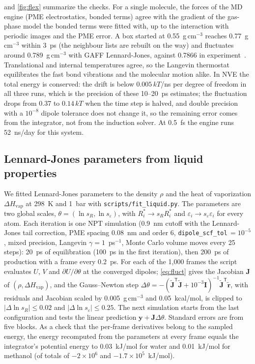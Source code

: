 \documentclass[11pt]{article}
\newcommand{\code}[1]{\texttt{#1}}
\newcommand{\Hvap}{\Delta H_\mathrm{vap}}
\begin{document}
 and \cref{fig:flex} summarize the checks. For a single molecule, the forces of the
MD engine (PME electrostatics, bonded terms) agree with the gradient of the gas-phase model the
bonded terms were fitted with, up to the interaction with periodic images and the PME error. A box
started at 0.55~g\,cm$^{-3}$ reaches 0.77~g\,cm$^{-3}$ within 3~ps (the neighbour lists are rebuilt on
the way) and fluctuates around 0.789~g\,cm$^{-3}$ with GAFF Lennard-Jones, against 0.7866 in
experiment~\cite{srivastava1987methanol}. Translational and internal temperatures agree, so the
Langevin thermostat equilibrates the fast bond vibrations and the molecular motion alike. In NVE
the total energy is conserved: the drift is below $0.005\,kT$/ns per degree of freedom in all three runs, which is the precision of these 10--20~ps estimates; the fluctuation drops from 0.37 to $0.14\,kT$ when the time step is halved, and double precision with a $10^{-8}$ dipole tolerance does not change it, so the remaining error comes from the integrator, not from the induction solver. At 0.5~fs the engine runs 52~ns/day for this
system.

\subsection{Lennard-Jones parameters from liquid properties}\label{sec:liquid}
We fitted Lennard-Jones parameters to the density $\rho$ and the heat of vaporization $\Hvap$ at
298~K and 1~bar with \code{scripts/fit\_liquid.py}. The parameters are two global scales,
$\theta=(\ln s_R,\ln s_\varepsilon)$, with $R^*_i\to s_R R^*_i$ and $\varepsilon_i\to s_\varepsilon
\varepsilon_i$ for every atom. Each iteration is one NPT simulation (0.9~nm cutoff with the
Lennard-Jones tail correction, PME spacing 0.08~nm and order 6, \code{dipole\_scf\_tol}\,$=10^{-5}$,
mixed precision, Langevin $\gamma=1$~ps$^{-1}$, Monte Carlo volume moves every 25 steps): 20~ps of
equilibration (100~ps in the first iteration), then 200~ps of production with a frame every
0.2~ps. For each of the 1,000 frames the script evaluates $U$, $V$ and $\partial U/\partial\theta$
at the converged dipoles; \cref{eq:fluct} gives the Jacobian $\bm J$ of $(\rho,\Hvap)$, and the
Gauss--Newton step $\Delta\theta=-(\tilde{\bm J}^\mathsf{T}\tilde{\bm J}+10^{-3}\bm I)^{-1}
\tilde{\bm J}^\mathsf{T}\tilde{\bm r}$, with residuals and Jacobian scaled by 0.005~g\,cm$^{-3}$ and
0.05~kcal/mol, is clipped to $|\Delta\ln s_R|\le0.02$ and $|\Delta\ln s_\varepsilon|\le0.25$. The
next simulation starts from the last configuration and tests the linear prediction
$\bm y+\bm J\Delta\theta$. Standard errors are from five blocks. As a check that the per-frame
derivatives belong to the sampled energy, the energy recomputed from the parameters at every frame
equals the integrator's potential energy to 0.03~kJ/mol for water and 0.01~kJ/mol for methanol
(of totals of $-2\times10^{6}$ and $-1.7\times10^5$~kJ/mol).
\end{document}
